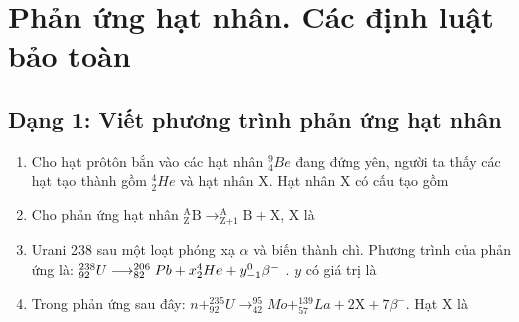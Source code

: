 \chapter{Phản ứng hạt nhân. Các định luật bảo toàn}
\section{Dạng 1: Viết phương trình phản ứng hạt nhân}
\begin{enumerate}
	\item {Cho hạt prôtôn bắn vào các hạt nhân $^9_4Be$ đang đứng yên, người ta thấy các hạt tạo thành gồm $^4_2He$ và hạt nhân X. Hạt nhân X có cấu tạo gồm
	}	
	\item {Cho phản ứng hạt nhân $^{\text{A}}_{\text{Z}} \text{B} \longrightarrow ^{\text{A}}_{\text{Z+1}} \text{B} + \text{X}$, X là
	}
	\item{Urani 238 sau một loạt phóng xạ $\alpha$ và biến thành chì. Phương trình của phản ứng là: $\\^{238}_{92} U \longrightarrow ^{206} _{82} Pb + x ^4_2He + y ^0_{-1} \beta^{-}$ . $y$ có giá trị là
	}
	\item {Trong phản ứng sau đây: $n+ ^{235}_{92} U \longrightarrow ^{95}_{42} Mo + ^{139}_{57} La + 2\text{X} + 7\beta^{-}$. Hạt X là
	}
\end{enumerate}




